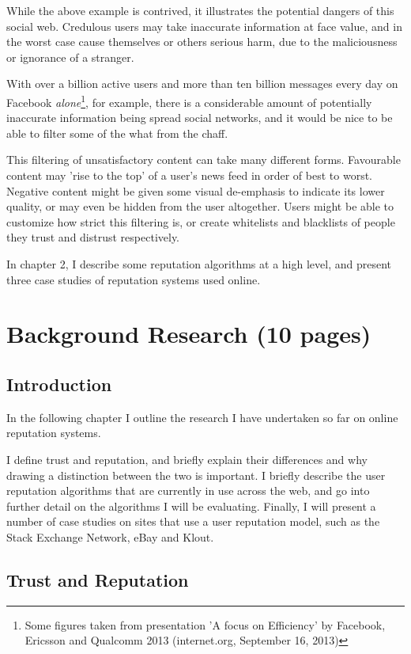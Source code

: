 \documentclass[]{final_report}
\begin{document}
While the above example is contrived, it illustrates the potential dangers of this social web. Credulous users may take inaccurate information at face value, and in the worst case cause themselves or others serious harm, due to the maliciousness or ignorance of a stranger.

With over a billion active users and more than ten billion messages every day on Facebook \textsl{alone}\footnote{Some figures taken from presentation 'A focus on Efficiency' by Facebook, Ericsson and Qualcomm 2013 (internet.org, September 16, 2013)}, for example, there is a considerable amount of potentially inaccurate information being spread social networks, and it would be nice to be able to filter some of the what from the chaff.

This filtering of unsatisfactory content can take many different forms. Favourable content may 'rise to the top' of a user's news feed in order of best to worst. Negative content might be given some visual de-emphasis to indicate its lower quality, or may even be hidden from the user altogether. Users might be able to customize how strict this filtering is, or create whitelists and blacklists of people they trust and distrust respectively.

In chapter 2, I describe some reputation algorithms at a high level, and present three case studies of reputation systems used online.



\chapter{Background Research (10 pages)}

\section{Introduction}

In the following chapter I outline the research I have undertaken so far on online reputation systems.

I define trust and reputation, and briefly explain their differences and why drawing a distinction between the two is important. I  briefly describe the user reputation algorithms that are currently in use across the web, and go into further detail on the algorithms I will be evaluating. Finally,  I will present a number of case studies on sites that use a user reputation model, such as the Stack Exchange Network, eBay and Klout.


\section{Trust and Reputation}
\end{document}
